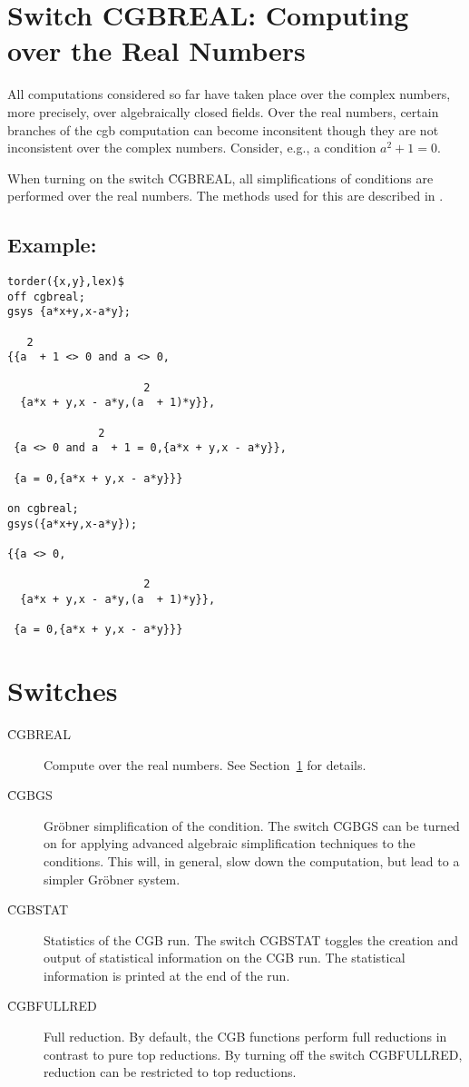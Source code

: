 \section{Switch CGBREAL: Computing over the Real Numbers}\label{cgbreal}
All computations considered so far have taken place over the complex
numbers, more precisely, over algebraically closed fields. Over the
real numbers, certain branches of the {\sc cgb} computation can become
inconsitent though they are not inconsistent over the complex numbers.
Consider, e.g., a condition $a^2+1=0$.

When turning on the switch \f{CGBREAL}, all 
simplifications of conditions are performed over the real numbers. 
The methods used for this are described in \cite{DolzmannSturm:97c}.
%
\subsection*{Example:}
\begin{verbatim}
torder({x,y},lex)$
off cgbreal;
gsys {a*x+y,x-a*y};

   2
{{a  + 1 <> 0 and a <> 0,

                     2
  {a*x + y,x - a*y,(a  + 1)*y}},

              2
 {a <> 0 and a  + 1 = 0,{a*x + y,x - a*y}},

 {a = 0,{a*x + y,x - a*y}}}

on cgbreal;
gsys({a*x+y,x-a*y});

{{a <> 0,

                     2
  {a*x + y,x - a*y,(a  + 1)*y}},

 {a = 0,{a*x + y,x - a*y}}}
\end{verbatim}

\section{Switches}
\begin{description}
\item[\f{CGBREAL}] Compute over the real numbers. See
Section~\ref{cgbreal} for details.

\item[\f{CGBGS}] Gr\"obner simplification of the condition. The switch
\f{CGBGS} can be turned on for applying advanced algebraic
simplification techniques to the conditions. This will, in general,
slow down the computation, but lead to a simpler Gr\"obner system.

\item[\f{CGBSTAT}] Statistics of the CGB run. The switch \f{CGBSTAT}
toggles the creation and output of statistical information on the CGB
run. The statistical information is printed at the end of the run.

\item[\f{CGBFULLRED}] Full reduction. By default, the CGB functions
perform full reductions in contrast to pure top reductions. By turning
off the switch \f{CGBFULLRED}, reduction can be restricted to top
reductions.
\end{description}
